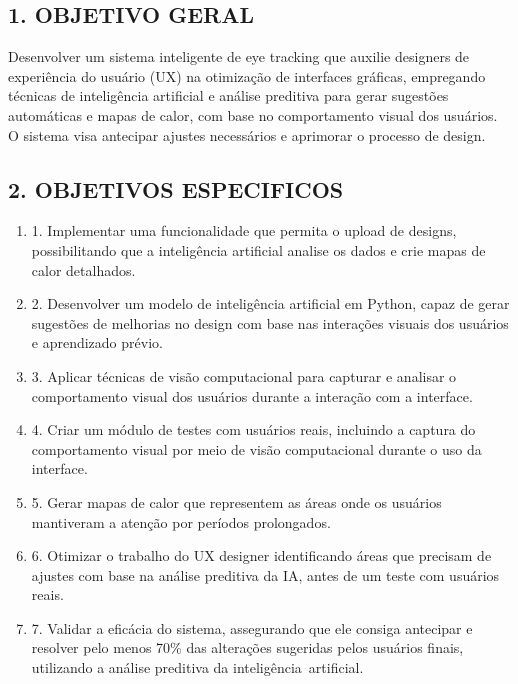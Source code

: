 \subsection*{1. OBJETIVO GERAL}


Desenvolver um sistema inteligente de eye tracking que auxilie designers de experiência do usuário (UX) na otimização de interfaces gráficas, empregando técnicas de inteligência artificial e análise preditiva para gerar sugestões automáticas e mapas de calor, com base no comportamento visual dos usuários. O sistema visa antecipar ajustes necessários e aprimorar o processo de design.

\subsection*{2. OBJETIVOS ESPECIFICOS}
\begin{enumerate}
    \item 1. Implementar uma funcionalidade que permita o upload de designs, possibilitando que a inteligência artificial analise os dados e crie mapas de calor detalhados.
    \item 2. Desenvolver um modelo de inteligência artificial em Python, capaz de gerar sugestões de melhorias no design com base nas interações visuais dos usuários e aprendizado prévio.
    \item 3. Aplicar técnicas de visão computacional para capturar e analisar o comportamento visual dos usuários durante a interação com a interface.
    \item 4. Criar um módulo de testes com usuários reais, incluindo a captura do comportamento visual por meio de visão computacional durante o uso da interface.
    \item 5. Gerar mapas de calor que representem as áreas onde os usuários mantiveram a atenção por períodos prolongados.
    \item 6. Otimizar o trabalho do UX designer identificando áreas que precisam de ajustes com base na análise preditiva da IA, antes de um teste com usuários reais.
    \item 7. Validar a eficácia do sistema, assegurando que ele consiga antecipar e resolver pelo menos 70\% das alterações sugeridas pelos usuários finais, utilizando a análise preditiva da inteligência artificial.
\end{enumerate}






